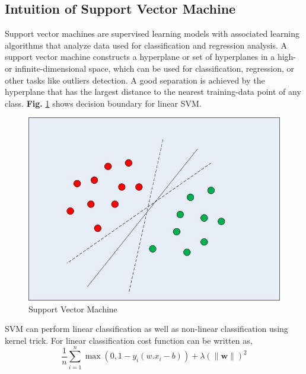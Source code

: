 \documentclass[12pt,a4paper]{report}
\begin{document}
\subsection{Intuition of Support Vector Machine}
Support vector machines are supervised learning models with associated learning algorithms that analyze data used for classification and regression analysis.  A support vector machine constructs a hyperplane or set of hyperplanes in a high- or infinite-dimensional space, which can be used for classification, regression, or other tasks like outliers detection. A good separation is achieved by the hyperplane that has the largest distance to the nearest training-data point of any class. \textbf{Fig.} \ref{fig:SVM} shows decision boundary for linear SVM.


\begin{figure}[h!]
    \centering
    \includegraphics[scale=0.4]{Figures/svm.png}
    \caption{Support Vector Machine}
    \label{fig:SVM}
\end{figure}

SVM can perform linear classification as well as non-linear classification using kernel trick. For linear classification cost function can be written as,
\begin{equation}
    \label{cost_function_svm}
    \frac{1}{n}\sum_{i=1}^{n}\max{(0,1-y_{i}(w.x_{i}-b))} + \lambda (\lVert \mathbf{w} \rVert)^2
\end{equation}
\end{document}
